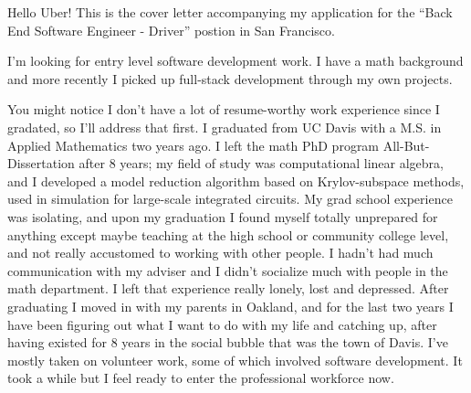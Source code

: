 \documentclass[12pt]{letter}
\begin{document}
Hello Uber! This is the cover letter accompanying my application for the ``Back End Software Engineer - Driver'' postion in San Francisco.

I'm looking for entry level software development work.  I have a math background and more recently I picked up full-stack development through my own projects.

You might notice I don't have a lot of resume-worthy work experience since I gradated, so I'll address that first.   I graduated from UC Davis with a M.S. in Applied Mathematics two years ago.  I left the math PhD program All-But-Dissertation after 8 years; my field of study was computational linear algebra, and I developed a model reduction algorithm based on Krylov-subspace methods, used in simulation for large-scale integrated circuits.  My grad school experience was isolating, and upon my graduation I found myself totally unprepared for anything except maybe teaching at the high school or community college level, and not really accustomed to working with other people.  I hadn't had much communication with my adviser and I didn't socialize much with people in the math department.  I left that experience really lonely, lost and depressed.  After graduating I moved in with my parents in Oakland, and for the last two years I have been figuring out what I want to do with my life and catching up, after having existed for 8 years in the social bubble that was the town of Davis.  I've mostly taken on volunteer work, some of which involved software development.  It took a while but I feel ready to enter the professional workforce now.
\end{document}

